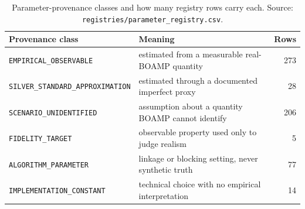 \begin{table}[htbp]
\centering
\small
\caption{Parameter-provenance classes and how many registry rows carry each. Source: \texttt{registries/parameter\_registry.csv}.}
\label{tab:provenance}
\begin{tabularx}{\textwidth}{l>{\raggedright\arraybackslash}Xr}
\toprule
Provenance class & Meaning & Rows \\
\midrule
\texttt{EMPIRICAL\_OBSERVABLE} & estimated from a measurable real-BOAMP quantity & 273 \\
\texttt{SILVER\_STANDARD\_APPROXIMATION} & estimated through a documented imperfect proxy & 28 \\
\texttt{SCENARIO\_UNIDENTIFIED} & assumption about a quantity BOAMP cannot identify & 206 \\
\texttt{FIDELITY\_TARGET} & observable property used only to judge realism & 5 \\
\texttt{ALGORITHM\_PARAMETER} & linkage or blocking setting, never synthetic truth & 77 \\
\texttt{IMPLEMENTATION\_CONSTANT} & technical choice with no empirical interpretation & 14 \\
\bottomrule
\end{tabularx}
\end{table}

